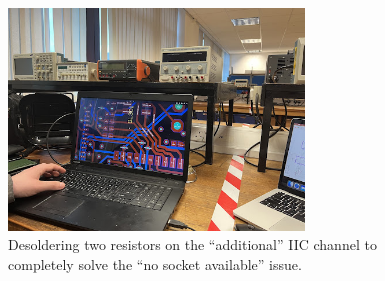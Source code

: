 \begin{figure}[htbp]
	\centering
	\includegraphics[width=0.7\textwidth]{
		fileForWriting/remove IIC}
	\caption{Desoldering two resistors on the ``additional'' IIC channel to completely solve the ``no socket available'' issue.}
	\label{fig:remove-IIC}
\end{figure}








